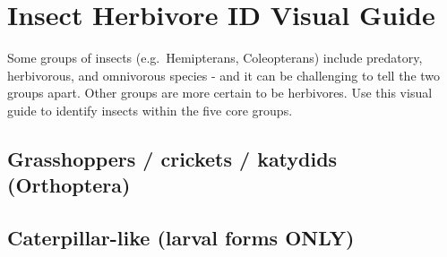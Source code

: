 \documentclass[
  letterpaper,
  DIV=11,
  numbers=noendperiod]{scrreprt}
\begin{document}
\section{Insect Herbivore ID Visual
Guide}\label{insect-herbivore-id-visual-guide}

Some groups of insects (e.g.~Hemipterans, Coleopterans) include
predatory, herbivorous, and omnivorous species - and it can be
challenging to tell the two groups apart. Other groups are more certain
to be herbivores. Use this visual guide to identify insects within the
five core groups.

\subsection{Grasshoppers / crickets / katydids
(Orthoptera)}\label{grasshoppers-crickets-katydids-orthoptera}

\begin{figure}


\caption{\label{fig-herbvivores1}}

\end{figure}%

\subsection{Caterpillar-like (larval forms
ONLY)}\label{caterpillar-like-larval-forms-only}

\begin{figure}


\caption{\label{fig-herbvivores2}}

\end{figure}%
\end{document}
